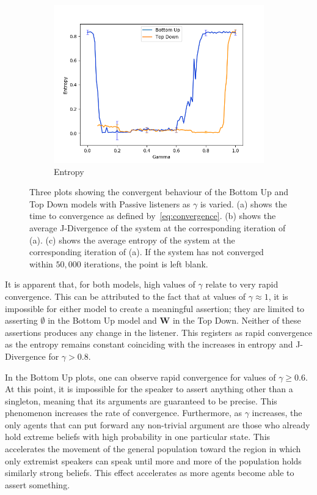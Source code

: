 \begin{figure}[h!]
\begin{subfigure}[ht]{0.45\textwidth}
    \includegraphics[width=\textwidth]{Images/Figures/BU+TD/None/Entropy_best.png}
    \caption{Entropy}\label{fig:entropy_convergence}
 \end{subfigure}
 \caption{ Three plots showing the convergent behaviour of the Bottom Up and Top Down models with Passive listeners as $\gamma$ is varied. (a) shows the time to convergence as defined by~\cref{eq:convergence}. (b) shows the average J-Divergence of the system at the corresponding iteration of (a). (c) shows the average entropy of the system at the corresponding iteration of (a). If the system has not converged within $50,000$ iterations, the point is left blank. }\label{fig:convergence_none}
\end{figure}

It is apparent that, for both models, high values of $\gamma$ relate to very rapid convergence. This can be attributed to the fact that at values of $\gamma \approx 1$, it is impossible for either model to create a meaningful assertion; they are limited to asserting $\emptyset$ in the Bottom Up model and $\mathbf{W}$ in the Top Down. Neither of these assertions produces any change in the listener. This registers as rapid convergence as the entropy remains constant coinciding with the increases in entropy and J-Divergence for $\gamma > 0.8$.

In the Bottom Up plots, one can observe rapid convergence for values of $\gamma \geq 0.6$. At this point, it is impossible for the speaker to assert anything other than a singleton, meaning that its arguments are guaranteed to be precise. This phenomenon increases the rate of convergence. Furthermore, as $\gamma$ increases, the only agents that can put forward any non-trivial argument are those who already hold extreme beliefs with high probability in one particular state. This accelerates the movement of the general population toward the region in which only extremist speakers can speak until more and more of the population holds similarly strong beliefs. This effect accelerates as more agents become able to assert something. 

